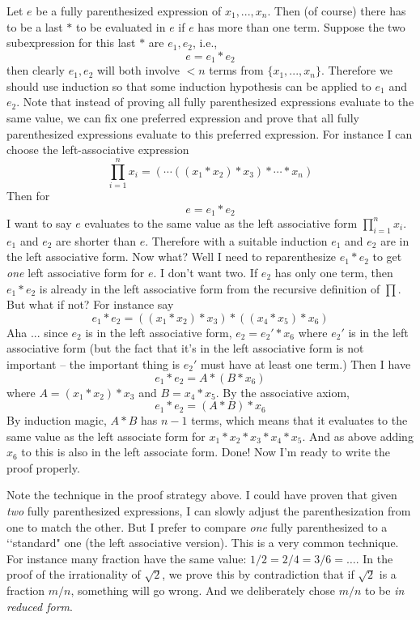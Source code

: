 
Let $e$ be a fully parenthesized expression of $x_1, ..., x_n$.
Then (of course) there has to be a last $*$ to be evaluated in $e$ if
$e$ has more than one term.
Suppose the two subexpression for this last $*$ are $e_1, e_2$, i.e.,
\[
e = e_1 * e_2
\]
then clearly $e_1, e_2$ will both involve $< n$ terms from $\{x_1, ..., x_n\}$.
Therefore we should use induction so that some induction hypothesis can be applied to
$e_1$ and $e_2$.
Note that instead of proving all fully parenthesized expressions evaluate to the
same value, we can fix one preferred expression and prove that
all fully parenthesized expressions evaluate to this preferred expression.
For instance I can choose the left-associative expression
\[
\prod_{i=1}^n x_i = ( \cdots ((x_1 * x_2) * x_3) * \cdots * x_n)
\]
Then for
\[
e = e_1 * e_2
\]
I want to say $e$ evaluates to the same value as the left associative form
$\prod_{i=1}^n x_i$.
$e_1$ and $e_2$ are shorter than $e$.
Therefore with a suitable induction $e_1$ and $e_2$ are in the left associative
form.
Now what?
Well I need to reparenthesize $e_1 * e_2$ to get \textit{one} left associative
form for $e$.
I don't want two.
If $e_2$ has only one term, then $e_1 * e_2$ is already in the left associative
form from the recursive definition of $\prod$.
But what if not?
For instance say
\[
e_1 * e_2 = ((x_1 * x_2) * x_3) * ((x_4 * x_5) * x_6)
\]
Aha ... since $e_2$ is in the left associative form,
$e_2 = e_2' * x_6$
where $e_2'$ is in the left associative form (but the fact that it's
in the left associative form is not important -- the important
thing is $e_2'$ must have at least one term.)
Then I have
\[
e_1 * e_2 = A * (B * x_6)
\]
where $A = (x_1 * x_2) * x_3$ and $B = x_4 * x_5$.
By the associative axiom,
\[
e_1 * e_2 = (A * B) * x_6
\]
By induction magic, $A*B$ has $n - 1$ terms,
which means that it evaluates to the same value as the left
associate form for $x_1 * x_2 * x_3 * x_4 * x_5$.
And as above adding $x_6$ to this is also in the left associate form.
Done!
Now I'm ready to write the proof properly.

Note the technique in the proof strategy above.
I could have proven that given \textit{two} fully parenthesized expressions,
I can slowly adjust the parenthesization from one to match the other.
But I prefer to compare \textit{one} fully parenthesized to a \lq\lq standard"
one (the left associative version).
This is a very common technique.
For instance many fraction have the same value: $1/2 = 2/4 = 3/6 = \ldots$.
In the proof of the irrationality of $\sqrt{2}$, we prove this by
contradiction that if $\sqrt{2}$ is a fraction $m/n$, something will go wrong.
And we deliberately chose $m/n$ to be \textit{in reduced form}.

